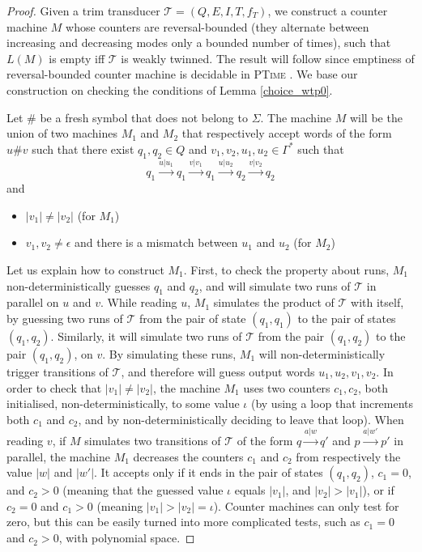 \documentclass[envcountsame]{llncs}
\newcommand\tra{\mathcal{T}}
\begin{document}
\begin{proof}
    Given a trim transducer $\tra = (Q,E,I,T,f_T)$, we construct a counter machine $M$
whose counters are reversal-bounded (they alternate between increasing
and decreasing modes only a bounded number of times), such that $L(M)$
is empty iff $\tra$ is weakly twinned. The result will follow since 
emptiness of reversal-bounded counter machine is decidable in
\textsc{PTime} \cite{JACM::Ibarra1978}. We base our construction on
checking the conditions of Lemma \ref{choice_wtp0}. 


Let $\#$ be a fresh symbol that does not belong to $\Sigma$. The machine
$M$ will be the union of two machines $M_1$ and $M_2$ that
respectively accept words of the form $u\#v$ such that there exist
$q_1,q_2\in Q$ and $v_1,v_2,u_1,u_2\in\Gamma^*$ such that
$$
q_1\xrightarrow{u|u_1} q_1\xrightarrow{v|v_1}q_1\xrightarrow{u|u_2} q_2\xrightarrow{v|v_2} q_2
$$
and 
\begin{itemize}
  \item $|v_1|\neq |v_2|$ (for $M_1$)
  \item $v_1,v_2\neq \epsilon$ and there is a mismatch between $u_1$
    and $u_2$ (for $M_2$)
\end{itemize}

Let us explain how to construct $M_1$. First, to check the property
about runs, $M_1$ non-deterministically guesses $q_1$ and $q_2$, 
and will simulate two runs of $\tra$ in parallel on $u$ and $v$. While
reading $u$, $M_1$ simulates the product of $\tra$ with itself, by guessing
two runs of $\tra$ from the pair of state $(q_1,q_1)$ to the pair of
states $(q_1,q_2)$.  Similarly, it will simulate two runs of $\tra$
from the pair $(q_1,q_2)$ to the pair $(q_1,q_2)$, on $v$. By
simulating these runs, $M_1$ will non-deterministically trigger 
transitions of $\tra$, and therefore will guess output words
$u_1,u_2,v_1,v_2$. In order to check that $|v_1|\neq |v_2|$, the
machine $M_1$ uses two counters $c_1,c_2$, both initialised,
non-deterministically, to some value $\iota$ (by using a loop that 
increments both $c_1$ and $c_2$, and by non-deterministically deciding
to leave that loop). When reading $v$, if $M$ simulates two
transitions of $\tra$ of the form $q\xrightarrow{a|w} q'$ and $p\xrightarrow{a|w'} p'$ in
parallel, the machine $M_1$ decreases the counters $c_1$ and $c_2$
from respectively the value $|w|$ and $|w'|$. It accepts only if it
ends in the pair of states $(q_1,q_2)$, $c_1 = 0$, and $c_2>0$
(meaning that the guessed value $\iota$ equals $|v_1|$, and
$|v_2|>|v_1|$), or if $c_2 = 0$ and $c_1 > 0$ (meaning $|v_1|>
|v_2|=\iota$). Counter machines can only test for zero, but this can
be easily turned into more complicated tests, such as $c_1 = 0$ and
$c_2 >0$, with polynomial space. 



\end{proof}
\end{document}
